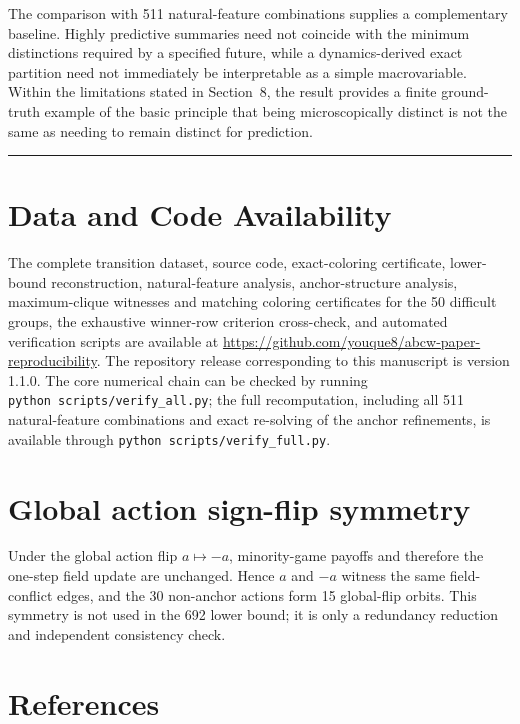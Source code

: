 \documentclass[
  11pt,
]{article}
\begin{document}
The comparison with 511 natural-feature combinations supplies a
complementary baseline. Highly predictive summaries need not coincide
with the minimum distinctions required by a specified future, while a
dynamics-derived exact partition need not immediately be interpretable
as a simple macrovariable. Within the limitations stated in
Section~8, the result provides a finite ground-truth example of the basic
principle that being microscopically distinct is not the same as needing
to remain distinct for prediction.

\begin{center}\rule{0.5\linewidth}{0.5pt}\end{center}

\section{Data and Code Availability}\label{data-and-code-availability}

The complete transition dataset, source code, exact-coloring
certificate, lower-bound reconstruction, natural-feature analysis,
anchor-structure analysis, maximum-clique witnesses and matching
coloring certificates for the 50 difficult groups, the exhaustive
winner-row criterion cross-check, and automated verification scripts are
available at
\url{https://github.com/youque8/abcw-paper-reproducibility}. The
repository release corresponding to this manuscript is version 1.1.0.
The core numerical chain can be checked by running
\texttt{python\ scripts/verify\_all.py}; the full recomputation,
including all 511 natural-feature combinations and exact re-solving of
the anchor refinements, is available through
\texttt{python\ scripts/verify\_full.py}.

\appendix
\section{Global action sign-flip symmetry}\label{appendix-sign-flip}

Under the global action flip \({a\mapsto-a}\), minority-game payoffs and
therefore the one-step field update are unchanged. Hence \({a}\) and
\({-a}\) witness the same field-conflict edges, and the 30 non-anchor
actions form 15 global-flip orbits. This symmetry is not used in the
692 lower bound; it is only a redundancy reduction and independent
consistency check.

\hypertarget{references}{%
\section*{References}\label{references}}
\end{document}
